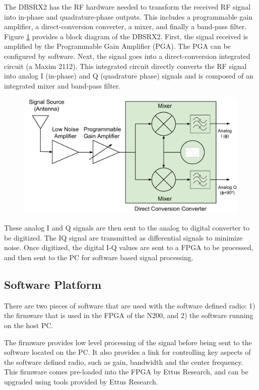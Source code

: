 The DBSRX2 has the RF hardware needed to transform the received RF signal into in-phase and quadrature-phase outputs.  This includes a programmable gain amplifier, a direct-conversion converter, a mixer, and finally a band-pass filter.  Figure \ref{dbsrx2_block} provides a block diagram of the DBSRX2.  First, the signal received is amplified by the Programmable Gain Amplifier (PGA).  The PGA can be configured by software.  Next, the signal goes into a direct-conversion integrated circuit (a Maxim 2112).  This integrated circuit directly converts the RF signal into analog I (in-phase) and Q (quadrature phase) signals and is composed of an integrated mixer and band-pass filter.

{\begin{figure}[h!tb] 
\centering
\includegraphics[width=12cm]{Images/DBSRX2_block.pdf}
\label{dbsrx2_block}
\end{figure}
}

These analog I and Q signals are then sent to the analog to digital converter to be digitized.  The IQ signal are transmitted as differential signals to minimize noise.  Once digitized, the digital I-Q values are sent to a FPGA to be processed, and then sent to the PC for software based signal processing.

\subsection{Software Platform} \label{software_platform}

There are two pieces of software that are used with the software defined radio:  1) the firmware that is used in the FPGA of the N200, and 2) the software running on the host PC.  

The firmware provides low level processing of the signal before being sent to the software located on the PC.  It also provides a link for controlling key aspects of the software defined radio, such as gain, bandwidth and the center frequency.  This firmware comes pre-loaded into the FPGA by Ettus Research, and can be upgraded using tools provided by Ettus Research.


